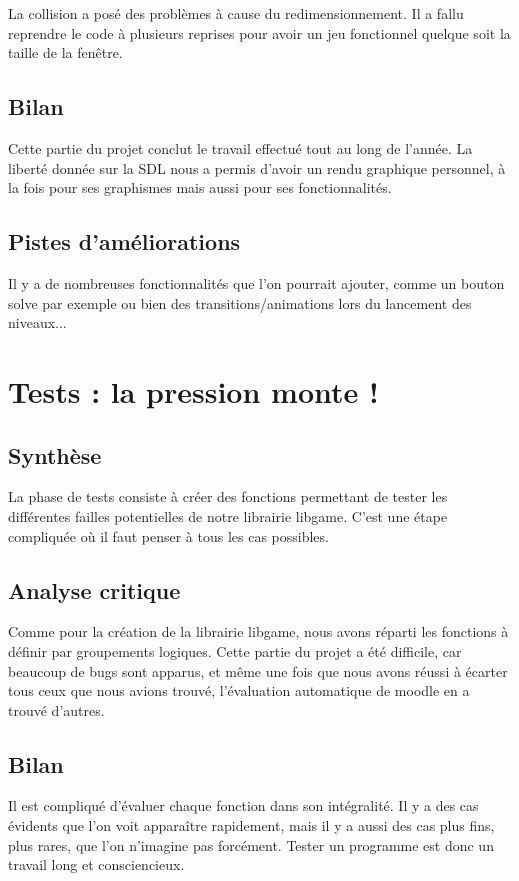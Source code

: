 \documentclass[12pt]{article}
\begin{document}
La collision a posé des problèmes à cause du redimensionnement. Il a fallu reprendre le code à plusieurs reprises pour avoir un jeu fonctionnel quelque soit la taille de la fenêtre.

\subsection{Bilan}
Cette partie du projet conclut le travail effectué tout au long de l'année. La liberté donnée sur la SDL nous a permis d'avoir un rendu graphique personnel, à la fois pour ses graphismes mais aussi pour ses fonctionnalités.

\subsection{Pistes d'améliorations}
Il y a de nombreuses fonctionnalités que l'on pourrait ajouter, comme un bouton solve par exemple ou bien des transitions/animations lors du lancement des niveaux...


\section{Tests : la pression monte !}
\subsection{Synthèse}
La phase de tests consiste à créer des fonctions permettant de tester les différentes failles potentielles de notre librairie libgame. C'est une étape compliquée où il faut penser à tous les cas possibles.

\subsection{Analyse critique}
Comme pour la création de la librairie libgame, nous avons réparti les fonctions à définir par groupements logiques. Cette partie du projet a été difficile, car beaucoup de bugs sont apparus, et même une fois que nous avons réussi à écarter tous ceux que nous avions trouvé, l'évaluation automatique de moodle en a trouvé d'autres.

\subsection{Bilan}
Il est compliqué d'évaluer chaque fonction dans son intégralité. Il y a des cas évidents que l'on voit apparaître rapidement, mais il y a aussi des cas plus fins, plus rares, que l'on n'imagine pas forcément. Tester un programme est donc un travail long et consciencieux.
\end{document}
